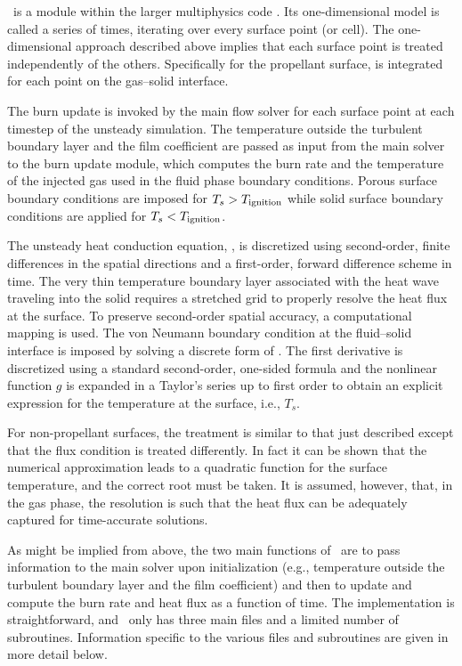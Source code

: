 \setcounter{figure}{0}
\setcounter{table}{0}
\setcounter{equation}{0}


\Rocburn\ is a module within the larger multiphysics code \Rocstar. Its one-dimensional model is called a series of times, iterating over every surface point (or cell). The one-dimensional approach described above implies that each surface point is treated independently of the others. Specifically for the propellant surface,  is integrated for each point on the gas--solid interface. 

The burn update is invoked by the main flow solver for each surface point at each timestep of the unsteady simulation. The temperature outside the turbulent boundary layer and the film coefficient are passed as input from the main solver to the burn update module, which computes the burn rate and the temperature of the injected gas used in the fluid phase boundary conditions. Porous surface boundary conditions are imposed for $T_s > T_{\rm ignition}$ while solid surface boundary conditions are applied for $T_s < T_{\rm ignition}$. 

The unsteady heat conduction equation, , is discretized using second-order, finite differences in the spatial directions and a first-order, forward difference scheme in time. The very thin temperature boundary layer associated with the heat wave traveling into the solid requires a stretched grid to properly resolve the heat flux at the surface. To preserve second-order spatial accuracy, a computational mapping is used. The von Neumann boundary condition at the fluid--solid interface is imposed by solving a discrete form of . The first derivative is discretized using a standard second-order, one-sided formula and the nonlinear function $g$ is expanded in a Taylor's series up to first order to obtain an explicit expression for the temperature at the surface, i.e., $T_s$. 

For non-propellant surfaces, the treatment is similar to that just described except that the flux condition  is treated differently. In fact it can be shown that the numerical approximation leads to a quadratic function for the surface temperature, and the correct root must be taken. It is assumed, however, that, in the gas phase, the resolution is such that the heat flux can be adequately captured for time-accurate solutions.

As might be implied from above, the two main functions of \Rocburn\ are to pass information to the main solver upon initialization (e.g., temperature outside the turbulent boundary layer and the film coefficient) and then to update and compute the burn rate and heat flux as a function of time. The implementation is straightforward, and \Rocburn\ only has three main files and a limited number of subroutines. Information specific to the various files and subroutines are given in more detail below.


